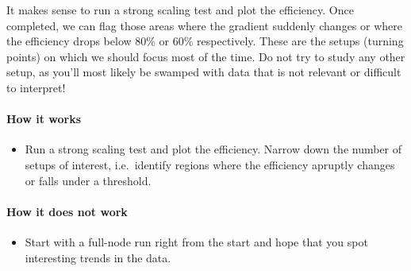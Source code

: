 \noindent
It makes sense to run a strong scaling test and plot the efficiency. 
Once completed, we can flag those areas where the gradient suddenly changes or   
where the efficiency drops below 80\% or 60\% respectively.
These are the setups (turning points) on which we should focus most of the time.
Do not try to study any other setup, as you'll most likely be swamped with data
that is not relevant or difficult to interpret!



\paragraph*{How it works}

\begin{itemize}[noitemsep]
  \item[$\boxplus$] Run a strong scaling test and plot the efficiency. Narrow down the number of setups of interest, i.e.~identify regions where the efficiency apruptly changes or falls under a threshold.
\end{itemize}


\paragraph*{How it does not work}

\begin{itemize}[noitemsep]
  \item[$\boxminus$] Start with a full-node run right from the start and hope that you spot interesting trends in the data.
\end{itemize}

